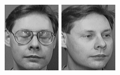 \begin{figure}[ht]
 \includegraphics[width=\columnwidth/11]{ch3/figures/s4_9.png}
 \includegraphics[width=\columnwidth/11]{ch3/figures/s4_10.png}\\

\end{figure}
